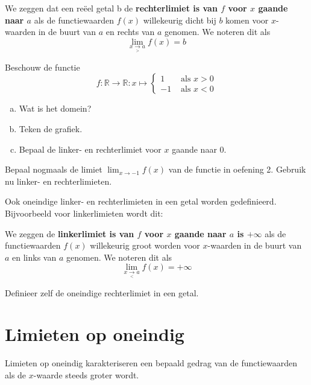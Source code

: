 \documentclass[12pt]{article}
\newenvironment{definitie}
{
  \vspace{0.4cm}
  \begin{mdframed}[nobreak=true,frametitle={Definitie}]
  }{%
  \end{mdframed}
}
\begin{document}
\begin{definitie}
  We zeggen dat een reëel getal b de {\bf rechterlimiet is van $f$ voor $x$ gaande naar $a$} als de functiewaarden $f(x)$ willekeurig dicht bij $b$ komen voor $x$-waarden in de buurt van $a$ en rechts van $a$ genomen. We noteren dit als
  $$\lim_{x\underset{>}{\to}a}f(x)=b$$
\end{definitie}

\begin{oefening}
  Beschouw de functie
  $$f:\mathbb{R}\to\mathbb{R}:x\mapsto\begin{cases}
    1 & \mbox{ als } x > 0\\
    -1& \mbox{ als } x < 0
  \end{cases}
  $$
  \begin{enumerate}[(a)]
  \item Wat is het domein?
  \item Teken de grafiek.
  \item Bepaal de linker- en rechterlimiet voor $x$ gaande naar $0$.
  \end{enumerate}
\end{oefening}

\begin{oefening}
  Bepaal nogmaals de limiet $\displaystyle\lim_{x\to-1} f(x)$ van de functie in oefening 2. Gebruik nu linker- en rechterlimieten.
\end{oefening}

Ook oneindige linker- en rechterlimieten in een getal worden gedefinieerd. Bijvoorbeeld voor linkerlimieten wordt dit:

\begin{definitie}
  We zeggen de {\bf linkerlimiet is van $f$ voor $x$ gaande naar $a$ is $+\infty$} als de functiewaarden $f(x)$ willekeurig groot worden voor $x$-waarden in de buurt van $a$ en links van $a$ genomen. We noteren dit als
  $$\lim_{x\underset{<}{\to}a}f(x)=+\infty$$
\end{definitie}

\begin{oefening}
  Definieer zelf de oneindige rechterlimiet in een getal.
\end{oefening}

\pagebreak
\section{Limieten op oneindig}

Limieten op oneindig karakteriseren een bepaald gedrag van de functiewaarden als de $x$-waarde steeds groter wordt.
\end{document}
